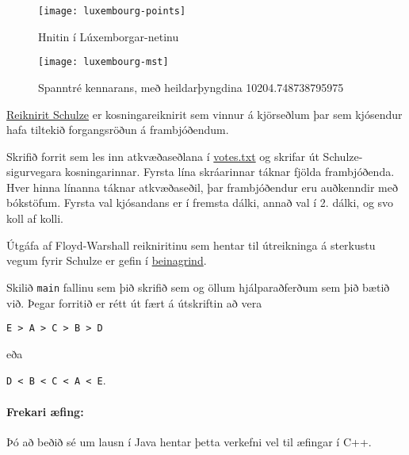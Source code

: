 \documentclass{article}
\begin{document}
\begin{figure}[h]
	\caption{Hnitin í Lúxemborgar-netinu}
	\begin{center}
		\texttt{[image: luxembourg-points]}
	\end{center}
\end{figure}

\begin{figure}
	\caption{Spanntré kennarans, með heildarþyngdina 10204.748738795975}
	\begin{center}
		\texttt{[image: luxembourg-mst]}
	\end{center}
\end{figure}

\clearpage

\question

\href{https://en.wikipedia.org/wiki/Schulze_method}{Reiknirit Schulze} er kosningareiknirit sem vinnur á kjörseðlum þar sem kjósendur hafa tiltekið forgangsröðun á frambjóðendum.

Skrifið forrit sem les inn atkvæðaseðlana í \href{https://github.com/Ernir/kennsluefni/tree/master/T2/Code/w12/votes.txt}{votes.txt} og skrifar út Schulze-sigurvegara kosningarinnar. Fyrsta lína skráarinnar táknar fjölda frambjóðenda. Hver hinna línanna táknar atkvæðaseðil, þar frambjóðendur eru auðkenndir með bókstöfum. Fyrsta val kjósandans er í fremsta dálki, annað val í 2. dálki, og svo koll af kolli.

Útgáfa af Floyd-Warshall reikniritinu sem hentar til útreikninga á sterkustu vegum fyrir Schulze er gefin í \href{https://github.com/Ernir/kennsluefni/tree/master/T2/Code/w12/Schulze.java}{beinagrind}.

Skilið \texttt{main} fallinu sem þið skrifið sem og öllum hjálparaðferðum sem þið bætið við. Þegar forritið er rétt út fært á útskriftin að vera
\begin{center}
	\texttt{E > A > C > B > D}
\end{center} 
eða
\begin{center}
	\texttt{D < B < C < A < E}.
\end{center}

\paragraph{Frekari æfing:} Þó að beðið sé um lausn í Java hentar þetta verkefni vel til æfingar í C++. 

\end{document}
